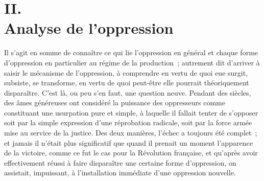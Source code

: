 \documentclass[french,twoside]{book} %
\begin{document}
\begin{center}
\noindent \centerline{}
\end{center}

\section[{II. Analyse de l’oppression}]{II. \\
Analyse de l’oppression}\renewcommand{\leftmark}{II. \\
Analyse de l’oppression}

\noindent \par
Il s'agit en somme de connaître ce qui lie l'oppression en général et chaque forme d'oppression en particulier au régime de la production ; autrement dit d'arriver à saisir le mécanisme de l'oppression, à comprendre en vertu de quoi eue surgit, subsiste, se transforme, en vertu de quoi peut-être elle pourrait théoriquement disparaître. C'est là, ou peu s'en faut, une question neuve. Pendant des siècles, des âmes généreuses ont considéré la puissance des oppresseurs comme constituant une usurpation pure et simple, à laquelle il fallait tenter de s'opposer soit par la simple expression d'une réprobation radicale, soit par la force armée mise au service de la justice. Des deux manières, l'échec a toujours été complet ; et jamais il n'était plus significatif que quand il prenait un moment l'apparence de la victoire, comme ce fut le cas pour la Révolution française, et qu'après avoir effectivement réussi à faire disparaître une certaine forme d'oppression, on assistait, impuissant, à l'installation immédiate d'une oppression nouvelle.\par
\end{document}
